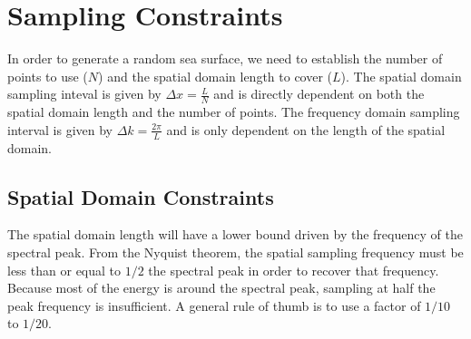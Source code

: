 \section{Sampling Constraints}\label{os_label:1d_sampling_constraints}
In order to generate a random sea surface, we need to establish the number of points to use ($N$) and the spatial domain length to cover ($L$). The spatial domain sampling inteval is given by $\Delta x = \frac{L}{N}$ and is directly dependent on both the spatial domain length and the number of points. The frequency domain sampling interval is given by $\Delta k = \frac{2\pi}{L}$ and is only dependent on the length of the spatial domain. 

\subsection{Spatial Domain Constraints}
The spatial domain length will have a lower bound driven by the frequency of the spectral peak. From the Nyquist theorem, the spatial sampling frequency must be less than or equal to $1/2$ the spectral peak in order to recover that frequency. Because most of the energy is around the spectral peak, sampling at half the peak frequency is insufficient. A general rule of thumb is to use a factor of $1/10$ to $1/20$.

